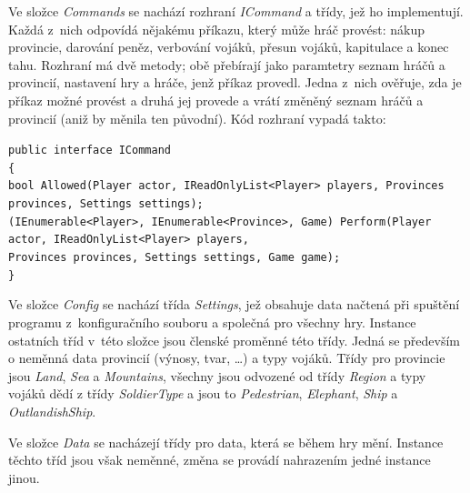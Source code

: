 \documentclass[a4paper,12pt]{article}
\begin{document}
Ve složce \textit{Commands} se nachází rozhraní \textit{ICommand} a třídy, jež ho implementují. Každá z~nich odpovídá nějakému příkazu, který může hráč provést: nákup provincie, darování peněz, verbování vojáků, přesun vojáků, kapitulace a konec tahu. Rozhraní má dvě metody; obě přebírají jako paramtetry seznam hráčů a provincií, nastavení hry a hráče, jenž příkaz provedl. Jedna z~nich ověřuje, zda je příkaz možné provést a druhá jej provede a vrátí změněný seznam hráčů a provincií (aniž by měnila ten původní). Kód rozhraní vypadá takto:

\scriptsize\selectfont
\texttt{\color{keyword}public interface \color{black}ICommand}\\
\texttt{\{}\\
\hspace*{8mm}\texttt{\color{keyword}bool \color{black}Allowed(Player actor, IReadOnlyList<Player> players, Provinces provinces, Settings settings);}\\
\hspace*{8mm}\texttt{(IEnumerable<Player>, IEnumerable<Province>, Game) Perform(Player actor, IReadOnlyList<Player> players,}\\
\hspace*{48mm}\texttt{Provinces provinces, Settings settings, Game game);}\\
\texttt{\}}
\normalsize

Ve složce \textit{Config} se nachází třída \textit{Settings}, jež obsahuje data načtená při spuštění programu z~konfiguračního souboru a společná pro všechny hry. Instance ostatních tříd v~této složce jsou členské proměnné této třídy. Jedná se především o neměnná data provincií (výnosy, tvar, \ldots) a typy vojáků. Třídy pro provincie jsou \textit{Land}, \textit{Sea} a \textit{Mountains}, všechny jsou odvozené od třídy \textit{Region} a typy vojáků dědí z třídy \textit{SoldierType} a jsou to \textit{Pedestrian}, \textit{Elephant}, \textit{Ship} a \textit{OutlandishShip}.

Ve složce \textit{Data} se nacházejí třídy pro data, která se během hry mění. Instance těchto tříd jsou však neměnné, změna se provádí nahrazením jedné instance jinou.

\newpage
\printbibliography[heading=bibintoc, title={Použitá literatura}]
\end{document}
